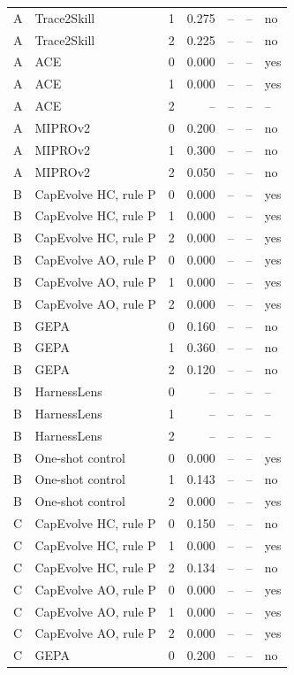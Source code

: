 \begin{table}[t]
\begin{tabular}{@{}llrrrrl@{}}
A & Trace2Skill & 1 & 0.275 & -- & -- & no \\
A & Trace2Skill & 2 & 0.225 & -- & -- & no \\
A & ACE & 0 & 0.000 & -- & -- & yes \\
A & ACE & 1 & 0.000 & -- & -- & yes \\
A & ACE & 2 & -- & -- & -- & -- \\
A & MIPROv2 & 0 & 0.200 & -- & -- & no \\
A & MIPROv2 & 1 & 0.300 & -- & -- & no \\
A & MIPROv2 & 2 & 0.050 & -- & -- & no \\
B & CapEvolve HC, rule P & 0 & 0.000 & -- & -- & yes \\
B & CapEvolve HC, rule P & 1 & 0.000 & -- & -- & yes \\
B & CapEvolve HC, rule P & 2 & 0.000 & -- & -- & yes \\
B & CapEvolve AO, rule P & 0 & 0.000 & -- & -- & yes \\
B & CapEvolve AO, rule P & 1 & 0.000 & -- & -- & yes \\
B & CapEvolve AO, rule P & 2 & 0.000 & -- & -- & yes \\
B & GEPA & 0 & 0.160 & -- & -- & no \\
B & GEPA & 1 & 0.360 & -- & -- & no \\
B & GEPA & 2 & 0.120 & -- & -- & no \\
B & HarnessLens & 0 & -- & -- & -- & -- \\
B & HarnessLens & 1 & -- & -- & -- & -- \\
B & HarnessLens & 2 & -- & -- & -- & -- \\
B & One-shot control & 0 & 0.000 & -- & -- & yes \\
B & One-shot control & 1 & 0.143 & -- & -- & no \\
B & One-shot control & 2 & 0.000 & -- & -- & yes \\
C & CapEvolve HC, rule P & 0 & 0.150 & -- & -- & no \\
C & CapEvolve HC, rule P & 1 & 0.000 & -- & -- & yes \\
C & CapEvolve HC, rule P & 2 & 0.134 & -- & -- & no \\
C & CapEvolve AO, rule P & 0 & 0.000 & -- & -- & yes \\
C & CapEvolve AO, rule P & 1 & 0.000 & -- & -- & yes \\
C & CapEvolve AO, rule P & 2 & 0.000 & -- & -- & yes \\
C & GEPA & 0 & 0.200 & -- & -- & no \\

\end{tabular}
\end{table}
